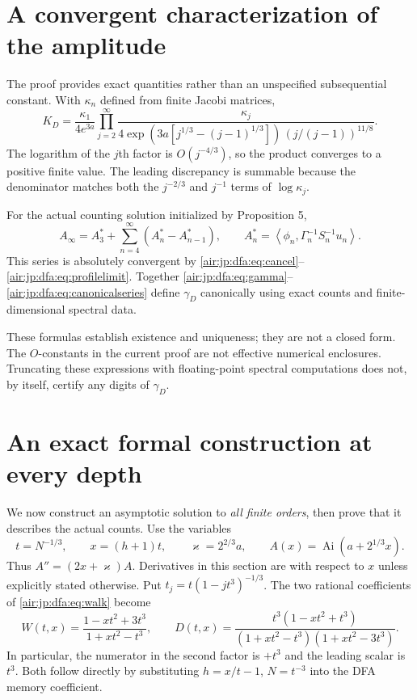 \documentclass[11pt,letterpaper]{article}
\numberwithin{equation}{section}
\theoremstyle{remark}
\newcommand{\Ai}{\operatorname{Ai}}
\newcommand{\ip}[2]{\left\langle#1,#2\right\rangle}
\begin{document}
\section{A convergent characterization of the amplitude}\label{air:jp:dfa:sec:amplitude}
The proof provides exact quantities rather than an unspecified subsequential constant. With $\kappa_n$ defined from finite Jacobi matrices,
\begin{equation}\label{air:jp:dfa:eq:canonicalproduct}
 K_D=\frac{\kappa_1}{4e^{3a}}
 \prod_{j=2}^\infty
 \frac{\kappa_j}
 {4\exp(3a[j^{1/3}-(j-1)^{1/3}])\,(j/(j-1))^{11/8}}.
\end{equation}
The logarithm of the $j$th factor is $O(j^{-4/3})$, so the product converges to a positive finite value. The leading discrepancy is summable because the denominator matches both the $j^{-2/3}$ and $j^{-1}$ terms of $\log\kappa_j$.

For the actual counting solution initialized by Proposition 5,
\begin{equation}\label{air:jp:dfa:eq:canonicalseries}
 A_\infty=A_3^*+\sum_{n=4}^\infty(A_n^*-A_{n-1}^*),
 \qquad A_n^*=\ip{\phi_n}{\Gamma_n^{-1}S_n^{-1}u_n}.
\end{equation}
This series is absolutely convergent by \eqref{air:jp:dfa:eq:cancel}--\eqref{air:jp:dfa:eq:profilelimit}. Together \eqref{air:jp:dfa:eq:gamma}--\eqref{air:jp:dfa:eq:canonicalseries} define $\gamma_D$ canonically using exact counts and finite-dimensional spectral data.

These formulas establish existence and uniqueness; they are not a closed form. The $O$-constants in the current proof are not effective numerical enclosures. Truncating these expressions with floating-point spectral computations does not, by itself, certify any digits of $\gamma_D$.

\section{An exact formal construction at every depth}\label{air:jp:dfa:sec:formal}
We now construct an asymptotic solution to \emph{all finite orders}, then prove that it describes the actual counts. Use the variables
\[
 t=N^{-1/3},\qquad x=(h+1)t,\qquad \varkappa=2^{2/3}a,
 \qquad A(x)=\Ai(a+2^{1/3}x).
\]
Thus $A''=(2x+\varkappa)A$. Derivatives in this section are with respect to $x$ unless explicitly stated otherwise. Put $t_j=t(1-jt^3)^{-1/3}$. The two rational coefficients of \eqref{air:jp:dfa:eq:walk} become
\begin{equation}\label{air:jp:dfa:eq:WD}
 W(t,x)=\frac{1-xt^2+3t^3}{1+xt^2-t^3},\qquad
 D(t,x)=\frac{t^3(1-xt^2+t^3)}{(1+xt^2-t^3)(1+xt^2-3t^3)}.
\end{equation}
In particular, the numerator in the second factor is $+t^3$ and the leading scalar is $t^3$. Both follow directly by substituting $h=x/t-1$, $N=t^{-3}$ into the DFA memory coefficient.
\end{document}
